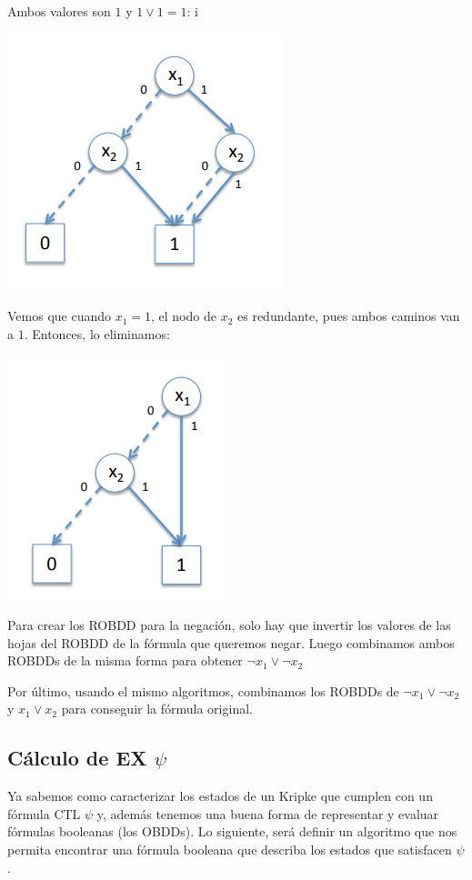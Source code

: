 Ambos valores son $1$ y $1\lor1 = 1$:
i\begin{center}
	\includegraphics[scale=0.35]{imagenes/compo-robdd11}
\end{center}

Vemos que cuando $x_1 = 1$, el nodo de $x_2$ es redundante, pues ambos caminos van a $1$. Entonces, lo eliminamos:
\begin{center}
	\includegraphics[scale=0.35]{imagenes/compo-robdd12}
\end{center}

Para crear los ROBDD para la negación, solo hay que invertir los valores de las hojas del ROBDD de la fórmula que queremos negar. Luego combinamos ambos ROBDDs de la misma forma para obtener $\lnot x_1 \lor \lnot x_2$

Por último, usando el mismo algoritmos, combinamos los ROBDDs de $\lnot x_1 \lor \lnot x_2$ y $x_1 \lor x_2$ para conseguir la fórmula original.


\subsection{Cálculo de EX $\psi$}
Ya sabemos como caracterizar los estados de un Kripke que cumplen con un fórmula CTL $\psi$ y, además tenemos una buena forma de representar y evaluar fórmulas booleanas (los OBDDs). Lo siguiente, será definir un algoritmo que nos permita encontrar una fórmula booleana que describa los estados que satisfacen $\psi$.

